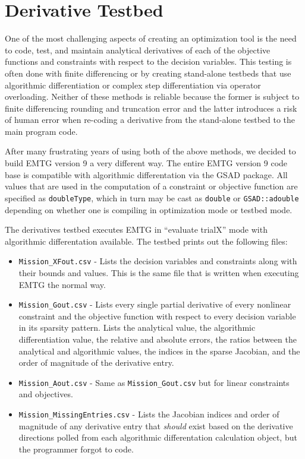 \chapter{Derivative Testbed}
\label{chap:testing}

One of the most challenging aspects of creating an optimization tool is the need to code, test, and maintain analytical derivatives of each of the objective functions and constraints with respect to the decision variables. This testing is often done with finite differencing or by creating stand-alone testbeds that use algorithmic differentiation or complex step differentiation via operator overloading. Neither of these methods is reliable because the former is subject to finite differencing rounding and truncation error and the latter introduces a risk of human error when re-coding a derivative from the stand-alone testbed to the main program code.

After many frustrating years of using both of the above methods, we decided to build \ac{EMTG} version 9 a very different way. The entire \ac{EMTG} version 9 code base is compatible with algorithmic differentation via the \ac{GSAD} package. All values that are used in the computation of a constraint or objective function are specified as \texttt{doubleType}, which in turn may be cast as \texttt{double} or \texttt{GSAD::adouble} depending on whether one is compiling in optimization mode or testbed mode.

The derivatives testbed executes \ac{EMTG} in ``evaluate trialX'' mode with algorithmic differentation available. The testbed prints out the following files:

\begin{itemize}
	\item \texttt{Mission\_XFout.csv} - Lists the decision variables and constraints along with their bounds and values. This is the same file that is written when executing \ac{EMTG} the normal way.
	\item \texttt{Mission\_Gout.csv} - Lists every single partial derivative of every nonlinear constraint and the objective function with respect to every decision variable in its sparsity pattern. Lists the analytical value, the algorithmic differentiation value, the relative and absolute errors, the ratios between the analytical and algorithmic values, the indices in the sparse Jacobian, and the order of magnitude of the derivative entry.
	\item \texttt{Mission\_Aout.csv} - Same as \texttt{Mission\_Gout.csv} but for linear constraints and objectives.
	\item \texttt{Mission\_MissingEntries.csv} - Lists the Jacobian indices and order of magnitude of any derivative entry that \textit{should} exist based on the derivative directions polled from each algorithmic differentation calculation object, but the programmer forgot to code.
\end{itemize}

